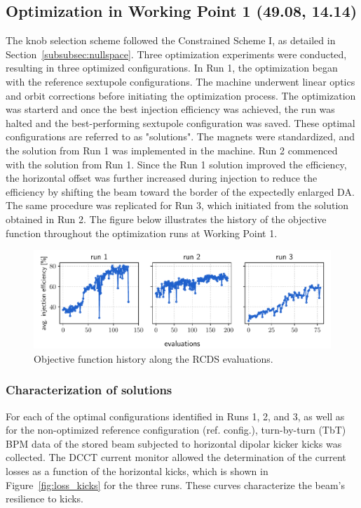 \subsection{Optimization in Working Point 1 (49.08, 14.14)}
The knob selection scheme followed the Constrained Scheme I, as detailed in Section~\ref{subsubsec:nullspace}. Three optimization experiments were conducted, resulting in three optimized configurations. In Run 1, the optimization began with the reference sextupole configurations. The machine underwent linear optics and orbit corrections before initiating the optimization process. The optimization was starterd and once the best injection efficiency was achieved, the run was halted and the best-performing sextupole configuration was saved. These optimal configurations are referred to as "solutions". The magnets were standardized, and the solution from Run 1 was implemented in the machine. Run 2 commenced with the solution from Run 1. Since the Run 1 solution improved the efficiency, the horizontal offset was further increased during injection to reduce the efficiency by shifting the beam toward the border of the expectedly enlarged DA. The same procedure was replicated for Run 3, which initiated from the solution obtained in Run 2. The figure below illustrates the history of the objective function throughout the optimization runs at Working Point 1.
\begin{figure}[tb]
    \centering
    \includegraphics[width=\columnwidth]{Images/wp1_objfunc_hist.pdf}
    \caption{Objective function history along the RCDS evaluations.}
\end{figure}
\subsubsection{Characterization of solutions}
For each of the optimal configurations identified in Runs 1, 2, and 3, as well as for the non-optimized reference configuration (ref. config.), turn-by-turn (TbT) BPM data of the stored beam subjected to horizontal dipolar kicker kicks was collected. The DCCT current monitor allowed the determination of the current losses as a function of the horizontal kicks, which is shown in Figure~\ref{fig:loss_kicks} for the three runs. These curves characterize the beam's resilience to kicks.

